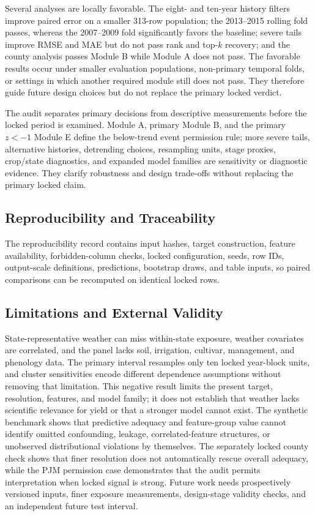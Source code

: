 \documentclass[conference]{IEEEtran}
\begin{document}
Several analyses are locally favorable. The eight- and ten-year history filters
improve paired error on a smaller 313-row population; the 2013--2015 rolling fold
passes, whereas the 2007--2009 fold significantly favors the baseline; severe
tails improve RMSE and MAE but do not pass rank and top-$k$ recovery; and the county
analysis passes Module B while Module A does not pass. The favorable results
occur under smaller evaluation populations, non-primary temporal folds, or
settings in which another required module still does not pass. They therefore
guide future design choices but do not replace the primary locked verdict.

The audit separates primary decisions from descriptive measurements before the
locked period is examined. Module A, primary Module B, and the primary $z<-1$
Module E define the below-trend event permission rule; more severe tails,
alternative histories, detrending choices, resampling units, stage proxies,
crop/state diagnostics, and expanded model families are sensitivity or diagnostic
evidence. They clarify robustness and design trade-offs without replacing the
primary locked claim.

\subsection{Reproducibility and Traceability}
The reproducibility record contains input hashes, target construction, feature
availability, forbidden-column checks, locked configuration, seeds, row IDs,
output-scale definitions, predictions, bootstrap draws, and table inputs, so
paired comparisons can be recomputed on identical locked rows.

\subsection{Limitations and External Validity}
State-representative weather can miss within-state exposure, weather covariates
are correlated, and the panel lacks soil, irrigation, cultivar, management, and
phenology data. The primary interval resamples only ten locked year-block units, and
cluster sensitivities encode different dependence assumptions without removing
that limitation. This negative result limits the present target, resolution,
features, and model family; it does not establish that weather lacks scientific
relevance for yield or that a stronger model cannot exist. The synthetic
benchmark shows that predictive adequacy and feature-group value cannot identify
omitted confounding, leakage, correlated-feature structures, or unobserved
distributional violations by themselves. The separately locked county check shows
that finer resolution does not automatically rescue overall adequacy, while the
PJM permission case demonstrates that the audit permits interpretation when
locked signal is strong.
Future work needs prospectively versioned inputs, finer exposure measurements,
design-stage validity checks, and an independent future test interval.
\end{document}
